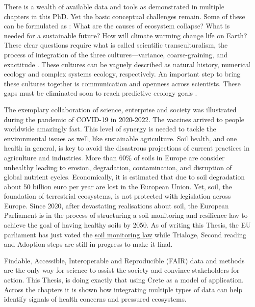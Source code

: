 There is a wealth of available data and tools as demonstrated in 
multiple chapters in this PhD. Yet the basic conceptual challenges remain. 
Some of these can be formulated as : What are the causes of ecosystem collapse?
What is needed for a sustainable future?
How will climate warming change life on Earth?
These clear questions require what is called scientific transculturalism,
the process of integration of the three cultures—variance, coarse-graining, and exactitude \parencite{Enquist_2024}.
These cultures can be vaguely described as natural history, numerical ecology and complex systems ecology, respectively.
An important step to bring these cultures together is communication and openness across scientists.
These gaps must be eliminated soon to reach predictive ecology goals \parencite{mouquet_review_2015}.

The exemplary collaboration of science, enterprise and society was
illustrated during the pandemic of COVID-19 in 2020-2022. 
The vaccines arrived to people worldwide amazingly fast.
This level of synergy is needed to tackle the environmental issues
as well, like sustainable agriculture. Soil health,
and one health in general, is key to avoid the disastrous projections of
current practices in agriculture and industries. More than 60\% of
soils in Europe are consider unhealthy leading to erosion, degradation, contamination,
and disruption of global nutrient cycles.
Economically, it is estimated that due to soil degradation about 50 billion euro per year
are lost in the European Union. 
Yet, soil, the foundation of 
terrestrial ecosystems, is not protected with legislation across Europe.
Since 2020, after devastating realisations about soil, the European Parliament 
is in the process of structuring a soil monitoring and resilience law to achieve 
the goal of having healthy soils by 2050. As of writing this Thesis, the EU 
parliament has just voted the \href{https://www.europarl.europa.eu/thinktank/en/document/EPRS_BRI(2024)757627}{soil monitoring law}
while Trialoge, Second reading and Adoption steps are still in progress to make it final.

Findable, Accessible, Interoperable and Reproducible (FAIR) data and methods
are the only way for science to assist the society and convince stakeholders for action. 
This Thesis, is doing exactly that using Crete as a model of application. Across the chapters it is shown how 
integrating multiple types of data can help identify signals of health concerns and 
pressured ecosystems.
